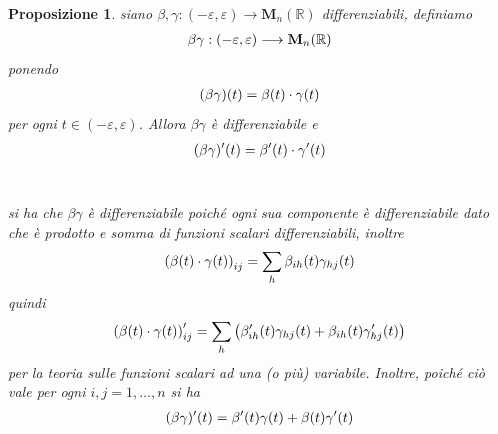 \documentclass[oneside, 11pt]{amsbook}
\makeatletter
\newcommand{\0}{{(0)}}
\newcommand{\3}{{(3)}}
\theoremstyle{colonplain}
\newtheorem{prop}[thm]{Proposizione}
\theoremstyle{colondefinition}
\theoremstyle{colonremark}
\numberwithin{equation}{chapter}
\renewcommand{\proofname}{Dimostrazione}
\renewenvironment{proof}[1][\proofname]{\par
  \pushQED{\qed}%
  \normalfont \topsep6\p@\@plus6\p@\relax
  \trivlist
  \item[\hskip\labelsep\bfseries #1:]\ignorespaces
}{%
  \popQED\endtrivlist\@endpefalse
}
\makeatother
\begin{document}
\begin{prop} siano $\beta, \gamma : (-\varepsilon, \varepsilon) \longrightarrow \mathbf{M}_n(\mathbb{R})$ differenziabili, definiamo
\begin{align}
    \beta\gamma : (-\varepsilon, \varepsilon) \longrightarrow \mathbf{M}_n(\mathbb{R}) \notag
\end{align}
ponendo
\begin{align}
    (\beta\gamma)(t) = \beta(t) \cdot \gamma(t) \notag
\end{align}
per ogni $t \in (-\varepsilon, \varepsilon)$. Allora $\beta\gamma$ è differenziabile e
\begin{align}
    (\beta\gamma)'(t) = \beta'(t) \cdot \gamma'(t) \notag
\end{align} \\

\begin{proof} si ha che $\beta\gamma$ è differenziabile poiché ogni sua componente è differenziabile dato che è prodotto e somma di funzioni scalari differenziabili, inoltre
\begin{align}
    \left( \beta(t) \cdot \gamma(t) \right)_{ij} = \sum_h \beta_{ih}(t)\gamma_{hj}(t) \notag 
\end{align}
quindi
\begin{align}
    \left( \beta(t) \cdot \gamma(t) \right)'_{ij} = \sum_h \left( \beta'_{ih}(t)\gamma_{hj}(t) + \beta_{ih}(t)\gamma'_{hj}(t) \right) \notag
\end{align}
per la teoria sulle funzioni scalari ad una (o più) variabile. Inoltre, poiché ciò vale per ogni $i, j = 1, \dots, n$ si ha
\begin{align}
    (\beta\gamma)'(t) = \beta'(t)\gamma(t) + \beta(t)\gamma'(t) \notag
\end{align} \end{proof}
\end{prop}
\end{document}
